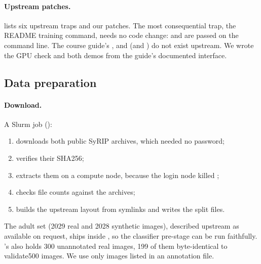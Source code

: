 \paragraph{Upstream patches.}  lists six upstream traps and our patches.
The most consequential trap, the README training command, needs no code change:  and  are passed on the command line.
The course guide's ,  and  (and ) do not exist upstream. We wrote the GPU check and both demos from the guide's documented interface.

\subsection{Data preparation}\label{app:data}

\paragraph{Download.} A Slurm job ():
\begin{enumerate}[leftmargin=*]
  \item downloads both public SyRIP archives, which needed no password;
  \item verifies their SHA256;
  \item extracts them on a compute node, because the login node killed ;
  \item checks file counts against the archives;
  \item builds the upstream layout from symlinks and writes the split files.
\end{enumerate}
The adult  set (2029 real and 2028 synthetic images), described upstream as available on request, ships inside , so the classifier pre-stage can be run faithfully.
's  also holds 300 unannotated real images, 199 of them byte-identical to validate500 images. We use only images listed in an annotation file.

